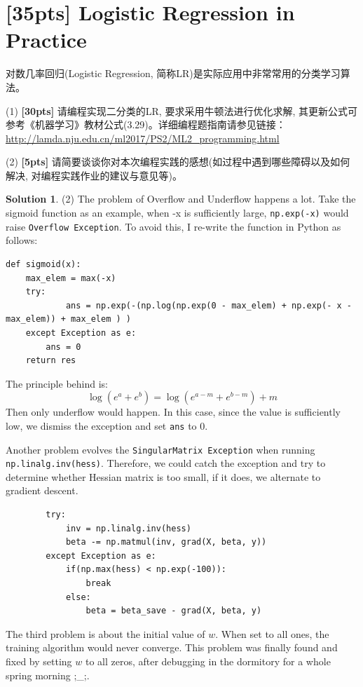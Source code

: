 \documentclass[a4paper,UTF8]{article}
\numberwithin{equation}{section}
\theoremstyle{definition}
\newtheorem*{solution}{Solution}
\begin{document}
\section{[35pts] Logistic Regression in Practice} 
对数几率回归(Logistic Regression, 简称LR)是实际应用中非常常用的分类学习算法。

(1) \textbf{[30pts]} 请编程实现二分类的LR, 要求采用牛顿法进行优化求解, 其更新公式可参考《机器学习》教材公式(3.29)。详细编程题指南请参见链接：\url{http://lamda.nju.edu.cn/ml2017/PS2/ML2_programming.html}

(2) \textbf{[5pts]} 请简要谈谈你对本次编程实践的感想(如过程中遇到哪些障碍以及如何解决, 对编程实践作业的建议与意见等)。
\begin{solution}
(2) The problem of Overflow and Underflow happens a lot. Take the sigmoid function as an example, when -x is sufficiently large, \texttt{np.exp(-x)} would raise \texttt{Overflow Exception}. To avoid this, I re-write the function in Python as follows:
\begin{verbatim}
def sigmoid(x):
    max_elem = max(-x) 
    try: 
        	ans = np.exp(-(np.log(np.exp(0 - max_elem) + np.exp(- x - max_elem)) + max_elem ) )
    except Exception as e:
        ans = 0
    return res
\end{verbatim}
The principle behind is:
\begin{equation}
\log{(e^a + e^b)} = \log{(e^{a-m} + e^{b-m})} + m
\end{equation}
Then only underflow would happen. In this case, since the value is sufficiently low, we dismiss the exception and set \texttt{ans} to 0.

\end{solution}
Another problem evolves the \texttt{SingularMatrix Exception}  when running  \texttt{np.linalg.inv(hess)}. Therefore, we could catch the exception and try to determine whether Hessian matrix is too small, if it does, we alternate to gradient descent.
\begin{verbatim}
        try:
            inv = np.linalg.inv(hess)
            beta -= np.matmul(inv, grad(X, beta, y))
        except Exception as e:
            if(np.max(hess) < np.exp(-100)):
                break
            else:
                beta = beta_save - grad(X, beta, y)
\end{verbatim}
The third problem is about the initial value of $w$. When set to all ones, the training algorithm would never converge. This problem was finally found and fixed by setting $w$ to all zeros, after debugging in the dormitory for a whole spring morning ;\_;.
\end{document}
